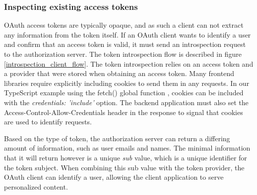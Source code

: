 \subsubsection{Inspecting existing access tokens}

OAuth access tokens are typically opaque, and as such a client can not extract any information from the token itself.
If an OAuth client wants to identify a user and confirm that an access token is valid, it must send an introspection request to the authorization server.
The token introspection flow is described in figure \ref{introspection_client_flow}.
The token introspection relies on an access token and a provider that were stored when obtaining an access token.
Many frontend libraries require explicitly including cookies to send them in any requests.
In our TypeScript example using the fetch() global function \citep{noauthor_fetch_2023}, cookies can be included with the \textit{credentials: 'include'} option.
The backend application must also set the Access-Control-Allow-Credentials header in the response to signal that cookies are used to identify requests.

Based on the type of token, the authorization server can return a differing amount of information, such as user emails and names.
The minimal information that it will return however is a unique \textit{sub} value, which is a unique identifier for the token subject.
When combining this sub value with the token provider, the OAuth client can identify a user, allowing the client application to serve personalized content.

